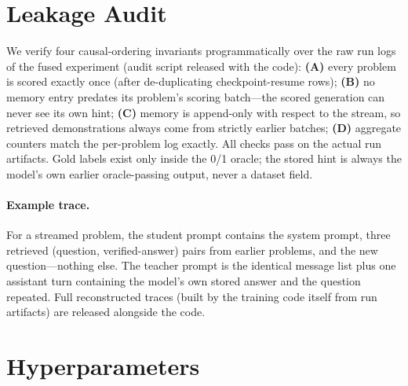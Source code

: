 \section{Leakage Audit}
\label{app:leakage}
We verify four causal-ordering invariants programmatically over the raw run logs
of the fused experiment (audit script released with the code):
\textbf{(A)} every problem is scored exactly once (after de-duplicating
checkpoint-resume rows); \textbf{(B)} no memory entry predates its problem's
scoring batch---the scored generation can never see its own hint; \textbf{(C)}
memory is append-only with respect to the stream, so retrieved demonstrations
always come from strictly earlier batches; \textbf{(D)} aggregate counters match
the per-problem log exactly. All checks pass on the actual run artifacts. Gold
labels exist only inside the 0/1 oracle; the stored hint is always the model's
own earlier oracle-passing output, never a dataset field.

\paragraph{Example trace.} For a streamed problem, the student prompt contains
the system prompt, three retrieved (question, verified-answer) pairs from
earlier problems, and the new question---nothing else. The teacher prompt is the
identical message list plus one assistant turn containing the model's own stored
answer and the question repeated. Full reconstructed traces (built by the
training code itself from run artifacts) are released alongside the code.

\section{Hyperparameters}
\label{app:hparams}

